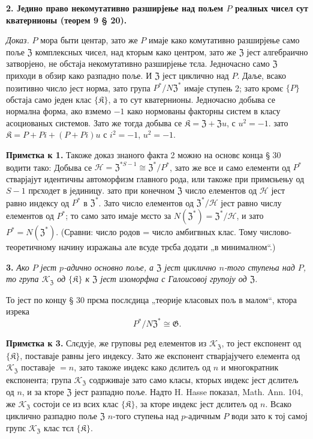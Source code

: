 \documentclass[11pt]{article}
\begin{document}
\noindent\textbf{2. Једино право некомутативно разширјење над пољем \(P\) реалных чисел сут кватернионы (теорем 9 § 20).}

\noindent\emph{Доказ.} \(P\) мора быти центар, зато же \(P\) имаје како комутативно разширјење само поље \(\mathfrak Z\) комплексных чисел, над кторым како центром, зато же \(\mathfrak Z\) јест алгебраично затворјено, не обстаја некомутативно разширјење тєла. Једночасно само \(\mathfrak Z\) приходи в обзир како разпадно поље. И \(\mathfrak Z\) јест циклично над \(P\). Даље, всако позитивно число јест норма, зато група \(P^*/N\mathfrak Z^*\) имаје ступењ 2; зато кромє \(\{P\}\) обстаја само једен клас \(\{\mathfrak K\}\), а то сут кватернионы. Једночасно добыва се нормална форма, ако взмемо \(-1\) како нормованы факторны систем в класу асоциованых системов. Зато же тогда добыва се \(\mathfrak K=\mathfrak Z+\mathfrak Zu\), с \(u^2=-1\). зато \(\mathfrak K=P+Pi+(P+Pi)u\) с \(i^2=-1\), \(u^2=-1\).

\noindent\textbf{Примєтка к 1.} Такоже доказ знаного факта 2 можно на основє конца § 30 водити тако: Добыва се \(\mathscr H=\mathfrak Z^{*S-1}\cong\mathfrak Z^*/P^*\), зато же все и само елементи од \(P^*\) стварјајут идентичны автоморфизм главного рода, или такоже при примєњењу од \(S-1\) прєходет в јединицу. зато при конечном \(\mathfrak Z\) число елементов од \(\mathscr H\) јест равно индексу од \(P^*\) в \(\mathfrak Z^*\). Зато число елементов од \(\mathfrak Z^*/\mathscr H\) јест равно числу елементов од \(P^*\); то само зато имаје мєсто за \(N(\mathfrak Z^*)=\mathfrak Z^*/\mathscr H\), и зато \(P^*=N(\mathfrak Z^*)\). (Сравни: число родов = число амбигвных клас. Тому числово-теоретичному начину изражања але всуде трєба додати „в минималном“.)

\noindent\textbf{3.} \emph{Ако \(P\) јест \(p\)-адично основно поље, а \(\mathfrak Z\) јест циклично \(n\)-того ступења над \(P\), то група \(\mathscr K_{\mathfrak Z}\) од \(\{\mathfrak K\}\) к \(\mathfrak Z\) јест изоморфна с Галоисовој групоју од \(\mathfrak Z\).}

То јест по концу § 30 прєма послєдица „теорије класовых пољ в малом“, ктора изрека
\[
P^*/N\mathfrak Z^*\cong\mathfrak G.
\]

\noindent\textbf{Примєтка к 3.} Слєдује, же груповы ред елементов из \(\mathscr K_{\mathfrak Z}\), то јест експонент од \(\{\mathfrak K\}\), поставаје равны јего индексу. Зато же експонент стварјајучего елемента од \(\mathscr K_{\mathfrak Z}\) поставаје \(=n\), зато такоже индекс како дєлитељ од \(n\) и многократник експонента; група \(\mathscr K_{\mathfrak Z}\) содрживаје зато само класы, кторых индекс јест дєлитељ од \(n\), и за кторе \(\mathfrak Z\) јест разпадно поље. Надто H. Hasse показал, Math. Ann. 104, же \(\mathscr K_{\mathfrak Z}\) состоји се из всих клас \(\{\mathfrak K\}\), за кторе индекс јест дєлитељ од \(n\). Всако циклично разпадно поље \(\mathfrak Z\) \(n\)-того ступења над \(p\)-адичным \(P\) води зато к тој самој групє \(\mathscr K_{\mathfrak Z}\) клас тєл \(\{\mathfrak K\}\).
\end{document}

